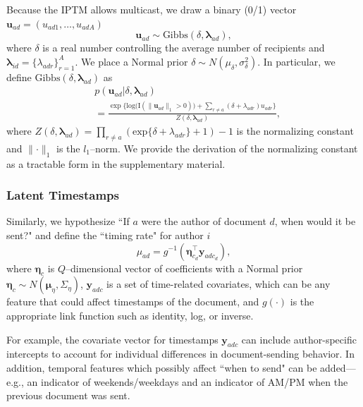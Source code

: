 \documentclass{article}
\begin{document}
Because the IPTM allows multicast, we draw a binary (0/1) vector $\boldsymbol{u}_{ad}= (u_{ad1},
\ldots, u_{adA})$
\begin{equation} \boldsymbol{u}_{ad}  \sim
\mbox{Gibbs}(\delta, \boldsymbol{\lambda}_{ad}),
\end{equation}
where $\delta$ is a real number controlling the average number of recipients and $\boldsymbol{\lambda}_{id}= \{\lambda_{adr}\}_{r=1}^A$. We place a Normal prior $\delta \sim N(\mu_\delta,\sigma^2_\delta)$. In particular, we define $\mbox{Gibbs}(\delta, \boldsymbol{\lambda}_{ad})$ as
\begin{equation}
\begin{aligned}
&p(\boldsymbol{u}_{ad}|\delta, \boldsymbol{\lambda}_{ad}) \\&= \frac{\exp\Big\{\mbox{log}\big(\text{I}( \lVert \boldsymbol{u}_{ad}\rVert_1 > 0 )\big) + \sum_{r\neq a} (\delta+\lambda_{adr})u_{adr}\Big\}}{Z(\delta,\boldsymbol{\lambda}_{ad})} ,
\end{aligned}
\label{eqn:Gibbs}
\end{equation}
where $Z(\delta,\boldsymbol{\lambda}_{ad})= \prod_{r \neq a} (\mbox{exp}\{\delta+\lambda_{adr}\} + 1)-1$ is the normalizing constant and $\lVert \cdot \rVert_1$ is the $l_1$--norm. We provide the derivation of the normalizing constant as a tractable form in the supplementary material. 

\subsubsection{Latent Timestamps}\label{subsubsec:Hypothetical Timestamps}
Similarly, we hypothesize ``If $a$ were the author of document $d$, when would it be sent?" and define the ``timing rate" for author $i$
\begin{equation}
\mu_{ad} = g^{-1}(\boldsymbol{\eta}_{c_d}^\top \boldsymbol{y}_{adc_d}),
\end{equation}
where $\boldsymbol{\eta}_c$ is $Q$--dimensional vector of coefficients with a Normal prior $\boldsymbol{\eta}_c \sim N(\boldsymbol{\mu}_\eta,\Sigma_\eta)$, $\boldsymbol{y}_{adc}$ is a set of time-related covariates, which can be any feature that could affect timestamps of the document, and $g(\cdot)$ is the appropriate link function such as identity, log, or inverse. 

For example, the covariate vector for timestamps $\boldsymbol{y}_{adc}$ can include author-specific intercepts to account for individual differences in document-sending behavior. In addition, temporal features which possibly affect ``when to send" can be added---e.g., an indicator of weekends/weekdays and an indicator of AM/PM when the previous document was sent. 
\end{document}
